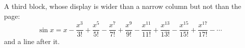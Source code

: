 A third block, whose display is wider than a narrow column but not than
the page:
\[
  \sin x = x - \frac{x^{3}}{3!} + \frac{x^{5}}{5!} - \frac{x^{7}}{7!} + \frac{x^{9}}{9!} - \frac{x^{11}}{11!} + \frac{x^{13}}{13!} - \frac{x^{15}}{15!} + \frac{x^{17}}{17!} - \dotsb
\]
and a line after it.
